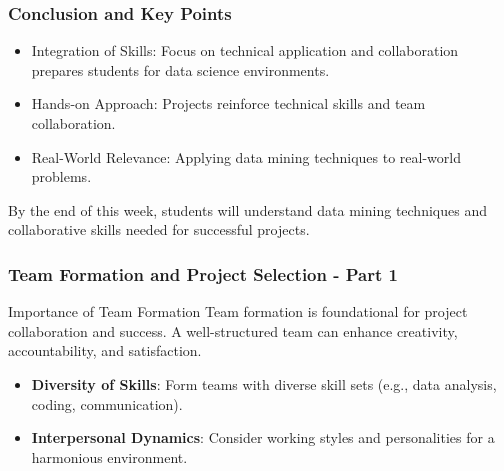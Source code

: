 \documentclass{beamer}
\begin{document}
\begin{frame}[fragile]
    \frametitle{Conclusion and Key Points}
    \begin{itemize}
        \item Integration of Skills: Focus on technical application and collaboration prepares students for data science environments.
        \item Hands-on Approach: Projects reinforce technical skills and team collaboration.
        \item Real-World Relevance: Applying data mining techniques to real-world problems.
    \end{itemize}
    By the end of this week, students will understand data mining techniques and collaborative skills needed for successful projects.
\end{frame}

\begin{frame}[fragile]
    \frametitle{Team Formation and Project Selection - Part 1}
    \begin{block}{Importance of Team Formation}
        Team formation is foundational for project collaboration and success. A well-structured team can enhance creativity, accountability, and satisfaction.
    \end{block}
    \begin{itemize}
        \item \textbf{Diversity of Skills}: Form teams with diverse skill sets (e.g., data analysis, coding, communication).
        \item \textbf{Interpersonal Dynamics}: Consider working styles and personalities for a harmonious environment.
    \end{itemize}
\end{frame}
\end{document}

